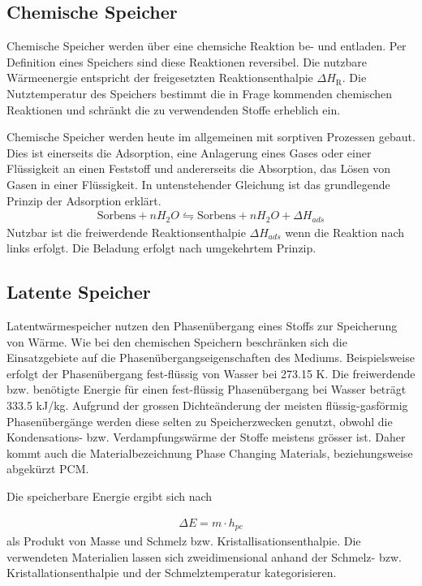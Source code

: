 \documentclass[11pt,a4paper]{scrartcl}
\begin{document}
\subsection{Chemische Speicher}
Chemische Speicher werden über eine chemsiche Reaktion be- und entladen. Per
Definition eines Speichers sind diese Reaktionen reversibel. Die nutzbare
Wärmeenergie entspricht der freigesetzten Reaktionsenthalpie $\Delta
H_{\mathrm{R}}$. Die Nutztemperatur des Speichers bestimmt die in Frage
kommenden chemischen Reaktionen und schränkt die zu verwendenden Stoffe
erheblich ein.

Chemische Speicher werden heute im allgemeinen mit sorptiven Prozessen gebaut.
Dies ist einerseits die Adsorption, eine Anlagerung eines Gases oder einer
Flüssigkeit an einen Feststoff und andererseits die Absorption, das Lösen von
Gasen in einer Flüssigkeit. In untenstehender Gleichung ist das grundlegende
Prinzip der Adsorption erklärt.
\begin{align}
\text{Sorbens}+nH_2O\leftrightharpoons \text{Sorbens}+nH_2O+\Delta H_{ads}
\end{align}
Nutzbar ist die freiwerdende Reaktionsenthalpie $\Delta H_{ads}$ wenn die
Reaktion nach links erfolgt. Die Beladung erfolgt nach umgekehrtem Prinzip.  
\cite{Wesselak}

\subsection{Latente Speicher}
Latentwärmespeicher nutzen den Phasenübergang eines Stoffs zur Speicherung von
Wärme. Wie bei den chemischen Speichern beschränken sich die Einsatzgebiete auf
die Phasenübergangseigenschaften des Mediums. Beispielsweise erfolgt der
Phasenübergang fest-flüssig von Wasser bei 273.15 K. Die freiwerdende bzw.
benötigte Energie für einen fest-flüssig Phasenübergang bei Wasser beträgt 333.5 kJ/kg.
Aufgrund der grossen Dichteänderung der meisten flüssig-gasförmig
Phasenübergänge werden diese selten zu Speicherzwecken genutzt, obwohl die
Kondensations- bzw. Verdampfungswärme der Stoffe meistens grösser ist. Daher
kommt auch die Materialbezeichnung \flqq Phase Changing Materials\frqq{}, beziehungsweise abgekürzt PCM.

Die speicherbare Energie ergibt sich nach

\begin{align}
\Delta E = m \cdot h_{pc}
\end{align}
als Produkt von Masse und Schmelz bzw. Kristallisationsenthalpie. Die
verwendeten Materialien lassen sich zweidimensional anhand der
Schmelz- bzw. Kristallationsenthalpie und der Schmelztemperatur kategorisieren. 
\end{document}

